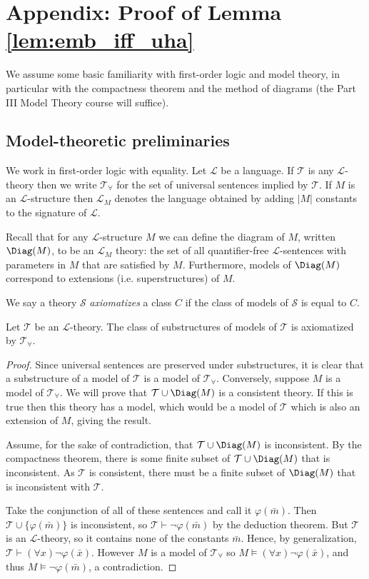 	\section{Appendix: Proof of Lemma \ref{lem:emb_iff_uha}}
We assume some basic familiarity with first-order logic and model theory, in particular with the compactness theorem and the method of diagrams (the Part III Model Theory course will suffice).
\subsection{Model-theoretic preliminaries}

We work in first-order logic with equality. Let $\mathcal{L}$ be a language. If $\mathcal{T}$ is any $\mathcal{L}$-theory then we write $\mathcal{T}_{\forall}$ for the set of universal sentences implied by $\mathcal{T}$. If $M$ is an $\mathcal{L}$-structure then $\mathcal{L}_M$ denotes the language obtained by adding $|M|$ constants to the signature of $\mathcal{L}$.

Recall that for any $\mathcal{L}$-structure $M$ we can define the diagram of $M$, written $\Diag(M)$, to be an $\mathcal{L}_M$ theory: the set of all quantifier-free $\mathcal{L}$-sentences with parameters in $M$ that are satisfied by $M$. Furthermore, models of $\Diag(M)$ correspond to extensions (i.e. superstructures) of $M$.

We say a theory $\mathcal{S}$ \emph{axiomatizes} a class $C$ if	the class of models of $\mathcal{S}$ is equal to $C$. 
\begin{lem}\label{lem:t_univ_ax_subs}
	Let $\mathcal{T}$ be an $\mathcal{L}$-theory. The class of substructures of models of $\mathcal{T}$ is axiomatized by $\mathcal{T}_{\forall}$.
\end{lem}
\begin{proof}
	Since universal sentences are preserved under substructures, it is clear that a substructure of a model of $\mathcal{T}$ is a model of $\mathcal{T}_{\forall}$. Conversely, suppose $M$ is a model of $\mathcal{T}_{\forall}$. We will prove that $\mathcal{T}\cup\Diag(M)$ is a consistent theory. If this is true then this theory has a model, which would be a model of $\mathcal{T}$ which is also an extension of $M$, giving the result.
	
	Assume, for the sake of contradiction, that $\mathcal{T}\cup\Diag(M)$ is inconsistent. By the compactness theorem, there is some finite subset of $\mathcal{T}\cup \Diag(M)$ that is inconsistent. As $\mathcal{T}$ is consistent, there must be a finite subset of $\Diag(M)$ that is inconsistent with $\mathcal{T}$.
	
	Take the conjunction of all of these sentences and call it $\varphi(\bar{m})$. Then $\mathcal{T}\cup\{\varphi(\bar{m})\}$ is inconsistent, so $\mathcal{T}\vdash \neg \varphi(\bar{m})$ by the deduction theorem. But $\mathcal{T}$ is an $\mathcal{L}$-theory, so it contains none of the constants $\bar{m}$. Hence, by generalization, $\mathcal{T} \vdash (\forall x)\neg \varphi(\bar{x})$. However $M$ is a model of $\mathcal{T}_{\forall}$ so $M \models (\forall x)\neg \varphi(\bar{x})$, and thus $M \models \neg \varphi(\bar{m})$, a contradiction.
\end{proof}

